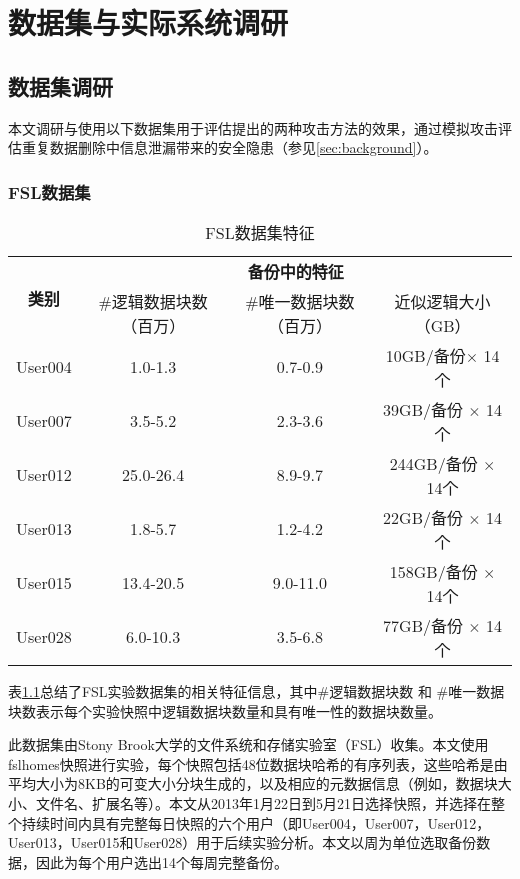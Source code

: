\chapter{数据集与实际系统调研}
\label{sec:DataSetSystem}
\section{数据集调研}

本文调研与使用以下数据集用于评估提出的两种攻击方法的效果，通过模拟攻击评估重复数据删除中信息泄漏带来的安全隐患（参见\ref{sec:background}）。

\subsection{FSL数据集}
\label{sec:fsl}
\begin{table}[!hbt]
    \caption{FSL数据集特征}
\small
\label{tab:FSL-dataset}
\centering
\begin{tabular}{|c|c|c|c|}
\hline
\multirow{2}{*}{\bf 类别} & \multicolumn{3}{c|}{\bf 备份中的特征} \\
\cline{2-4}
    & \#逻辑数据块数（百万） & \#唯一数据块数（百万） & 近似逻辑大小（GB）\\
\hline
User004  & 1.0-1.3 & 0.7-0.9 & 10GB/备份$\times$ 14个\\
\cline{1-4}
User007 &  3.5-5.2 & 2.3-3.6 & 39GB/备份 $\times$ 14个\\
\cline{1-4}
User012 &  25.0-26.4 & 8.9-9.7 & 244GB/备份 $\times$ 14个\\
\cline{1-4}
User013 &  1.8-5.7 & 1.2-4.2 & 22GB/备份 $\times$ 14个\\
\cline{1-4}
User015 &  13.4-20.5 & 9.0-11.0 & 158GB/备份 $\times$ 14个\\
\cline{1-4}
User028 &  6.0-10.3 & 3.5-6.8 & 77GB/备份 $\times$ 14个\\
\hline
\end{tabular}
\end{table}

表\ref{tab:FSL-dataset}总结了FSL实验数据集的相关特征信息，其中\#逻辑数据块数 和 \#唯一数据块数表示每个实验快照中逻辑数据块数量和具有唯一性的数据块数量。

此数据集由Stony Brook大学的文件系统和存储实验室（FSL）收集。本文使用fslhomes快照进行实验，每个快照包括48位数据块哈希的有序列表，这些哈希是由平均大小为8KB的可变大小分块生成的，以及相应的元数据信息（例如，数据块大小、文件名、扩展名等）。本文从2013年1月22日到5月21日选择快照，并选择在整个持续时间内具有完整每日快照的六个用户（即User004，User007，User012，User013，User015和User028）用于后续实验分析。本文以周为单位选取备份数据，因此为每个用户选出14个每周完整备份。

